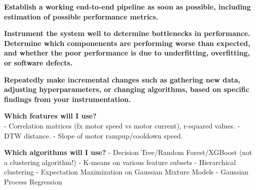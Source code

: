 \documentclass[11pt]{article}
\begin{document}
\textbf{Establish a working end-to-end pipeline as soon as possible,
including estimation of possible performance metrics.}

\textbf{Instrument the system well to determine bottlenecks in
performance. Determine which componenents are performing worse than
expected, and whether the poor performance is due to underfitting,
overfitting, or software defects.}

\textbf{Repeatedly make incremental changes such as gathering new data,
adjusting hyperparameters, or changing algorithms, based on specific
findings from your instrumentation.}

\textbf{Which features will I use?}\\
- Correlation matrices (fx motor speed vs motor current), r-squared
values. - DTW distance. - Slope of motor rampup/cooldown speed.

\textbf{Which algorithms will I use?} - Decision Tree/Random
Forest/XGBoost (not a clustering algorithm!) - K-means on various
feature subsets - Hierarchical clustering - Expectation Maximization on
Gaussian Mixture Models - Gaussian Process Regression


    
    
    
    
\end{document}

